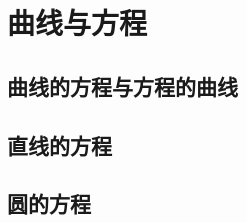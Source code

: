 
\section{曲线与方程}
\label{sec:curve-and-equation}

\subsection{曲线的方程与方程的曲线}
\label{sec:equation-of-curve-and-curve-of-equation}

\subsection{直线的方程}
\label{sec:equation-of-line}

\subsection{圆的方程}
\label{sec:equation-of-circle}


